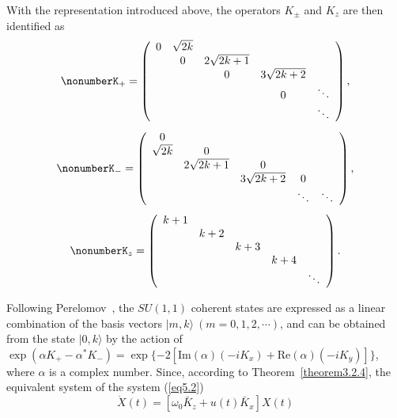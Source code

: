 \documentclass[onecolumn,showpacs,showkeys,preprintnumbers]{revtex4}
\begin{document}
\noindent With the representation introduced above, the operators
$K_\pm$ and $K_z$ are then identified as
\noindent\begin{equation}\nonumberK_+=\left(\begin{array}{ccccc}
  0 &  \sqrt{2k} &  &  &  \\
    & 0 & 2\sqrt{2k+1} &  &  \\
    &   & 0 & 3\sqrt{2k+2} &  \\
    &   &  & 0 & \ddots \\
    &   &  &  & \ddots \\
\end{array}\right),
\end{equation}
\noindent\begin{equation}\nonumberK_-=\left(\begin{array}{ccccc}
  0 &   &  &  &  \\
  \sqrt{2k} & 0 &  &  &  \\
    &  2\sqrt{2k+1} & 0 &  &  \\
    &   & 3\sqrt{2k+2} & 0 &  \\
    &   &  & \ddots & \ddots \\
\end{array}\right),
\end{equation}
\noindent\begin{equation}\nonumberK_z=\left(\begin{array}{ccccc}
  k+1 &  &  &  &  \\
   & k+2 &  &  &  \\
   &  & k+3 &  &  \\
   &  &  & k+4 &  \\
   &  &  &  & \ddots\\
\end{array}\right).
\end{equation}

\noindent Following Perelomov~\cite{Perelomov1}, the $SU(1,1)$
coherent states are expressed as a linear combination of the basis
vectors $|m,k\rangle~(m=0,1,2,\cdots)$, and can be obtained from
the state $|0,k\rangle$ by the action of
$\exp(\alpha{K_+}-\alpha^*{K_-})=\exp\{-2[\text{Im}(\alpha)(-iK_x)+\text{Re}(\alpha)(-iK_y)]\}$,
where $\alpha$ is a complex number. Since, according to
Theorem~\ref{theorem3.2.4}, the equivalent system of the system
(\ref{eq5.2})\noindent\begin{equation}\label{eq5.4}\dot{X}(t)=[\omega_0\bar{K}_z+u(t)\bar{K}_x]X(t)
\end{equation}
\end{document}
